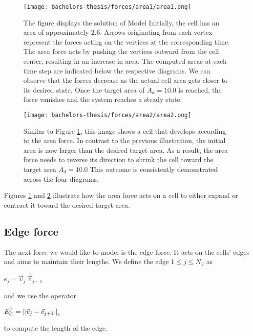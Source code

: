 \begin{figure}
	\begin{center}
		\texttt{[image: bachelors-thesis/forces/area1/area1.png]}
		\caption{The figure displays the solution of Model  
		Initially, the cell has an area of approximately $2.6$. 
		Arrows originating from each vertex represent the forces acting on the vertices at the corresponding time.
		The area force acts by pushing the vertices outward from the cell center, resulting in an increase in area.
		The computed areas at each time step are indicated below the respective diagrams.
		We can observe that the forces decrease as the actual cell area gets closer to its desired state. 
		Once the target area of $A_d = 10.0$ is reached, the force vanishes and the system reaches a steady state.
		}
		\label{fig:areaForce}
	\end{center}
\end{figure}

\begin{figure}
	\begin{center}
		\texttt{[image: bachelors-thesis/forces/area2/area2.png]}
		\caption{Similar to Figure \ref{fig:areaForce}, this image shows a cell that develops according to the area force. 
		In contrast to the previous illustration, the initial area is now larger than the desired target area.
		As a result, the area force needs to reverse its direction to shrink the cell toward the target area $A_d = 10.0$
		This outcome is consistently demonstrated across the four diagrams. }
		\label{fig:areaForce2}
	\end{center}
\end{figure}

Figures \ref{fig:areaForce} and \ref{fig:areaForce2} illustrate how the area force acts on a cell to either expand or contract it toward the desired target area.

    
\subsection{Edge force}
The next force we would like to model is the edge force. 
It acts on the cells' edges and aims to maintain their lengths.
We define the edge $1 \leq j \leq N_V$ as 
\begin{center}
	$
	e_j = \overline{\vec{v}_j \: \vec{v}_{j+1}}
	$
\end{center}
and we use the operator 
\begin{center}
	$
	E^j_C = \norm[\vec{v}_j - \vec{v}_{j+1}]
	$
\end{center}
to compute the length of the edge. 

